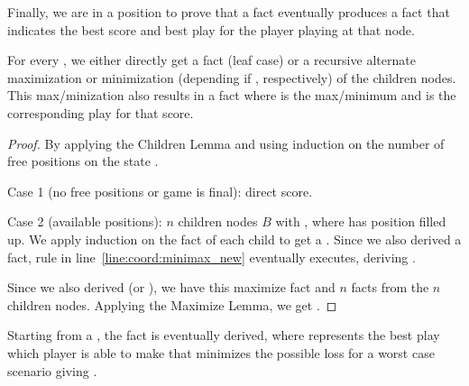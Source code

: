Finally, we are in a position to prove that a  fact eventually
produces a  fact that indicates the best score and best play for the
player playing at that node.

\begin{theorem}
For every , we either
directly get a  fact (leaf case) or a recursive alternate maximization or
minimization (depending if , respectively) of
the children nodes. This max/minization also results in a  fact where  is the max/minimum and  is the
corresponding play for that score.
\end{theorem}
\begin{proof}
By applying the Children Lemma and using induction on the number of free
positions on the state .

Case 1 (no free positions or game is final): direct score.

Case 2 (available positions): $n$ children nodes $B$ with , where  has position
 filled up. We apply induction on the  fact of each child
 to get a . Since we also derived a
 fact, rule in line~\ref{line:coord:minimax_new} eventually
executes, deriving .

Since we also derived  (or ), we
have this maximize fact and $n$  facts from the $n$ children
nodes. Applying the Maximize Lemma, we get .

\end{proof}

\begin{corollary}[MiniMax]
Starting from a , the fact
 is eventually derived, where  represents the
best play which player  is able to make that minimizes the possible loss for
a worst case scenario giving .
\end{corollary}

